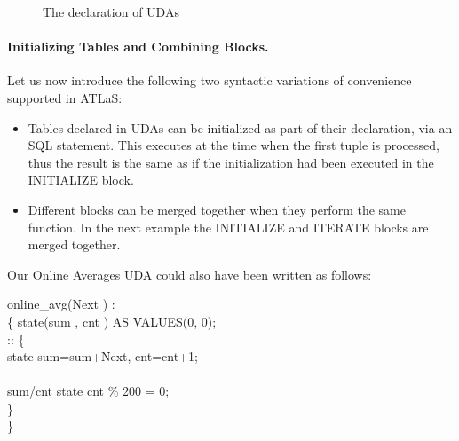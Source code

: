 \begin{figure}[!htp]
\centering
{}
\caption{The declaration of UDAs}
\end{figure}


\paragraph{Initializing Tables and Combining Blocks.}
Let us now introduce  the following two syntactic variations of
convenience supported in ATLaS:
\begin{itemize}
\inv \item Tables declared in UDAs can be initialized as part of their declaration,
via an SQL statement. This executes at the time when the first tuple is
processed, thus the result is the same as if the initialization had
been executed in the {\small INITIALIZE} block.

\inv \item Different blocks can be merged together when they perform the
same function. In the next example the {\small INITIALIZE}
and {\small ITERATE} blocks are merged together.
\end{itemize}
Our  Online Averages UDA could also have been written as follows:
\begin{codedisplay}
\> online\_avg(Next ) : \\
\>\{\> state(sum , cnt ) AS VALUES(0, 0); \\
\>\> ::  \{ \\
\>\>\>  state  sum=sum+Next, cnt=cnt+1;\\
\>\>\>   \\
\>\> \>  sum/cnt  state  cnt \% 200 = 0; \\
\>\>\}\\
\>\}
\end{codedisplay}

